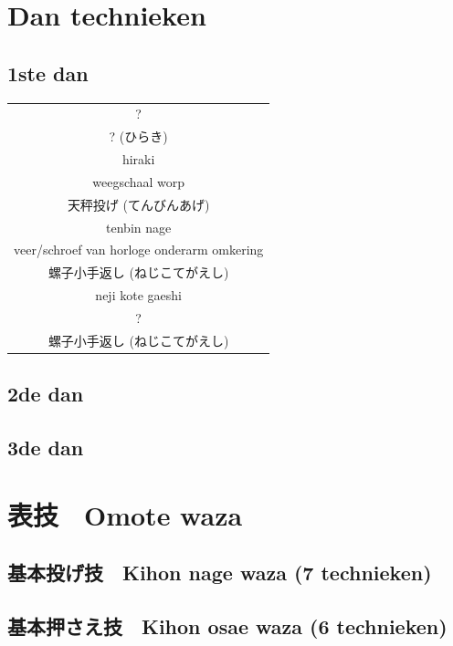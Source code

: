 \documentclass[12pt]{scrartcl}
\begin{document}
\begin{CJK*}{UTF8}{min}
\newpage
\section{Dan technieken}
\subsection{1ste dan}
\begin{table}[H]
\begin{center}
\begin{tabular}{c}
?\\
? (ひらき)\\
hiraki\\
\hline
weegschaal worp\\
天秤投げ (てんびんあげ)\\
tenbin nage\\
\hline
veer/schroef van horloge onderarm omkering\\
螺子小手返し (ねじこてがえし)\\
neji kote gaeshi\\
\hline
?\\
螺子小手返し (ねじこてがえし)\\
\end{tabular}
\end{center}
\label{dan_1}
\end{table}

\newpage
\subsection{2de dan}

\newpage
\subsection{3de dan}

\newpage
\section{表技　Omote waza}
\subsection{基本投げ技　Kihon nage waza (7 technieken)}

\subsection{基本押さえ技　Kihon osae waza (6 technieken)}


\end{CJK*}
\end{document}
